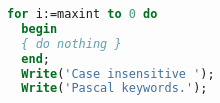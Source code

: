 \documentclass{article}
\begin{document}
  \begin{lstlisting}[language=Pascal]
  for i:=maxint to 0 do
  begin
  { do nothing }
  end;
  Write('Case insensitive ');
  Write('Pascal keywords.');
  \end{lstlisting}
\end{document}
